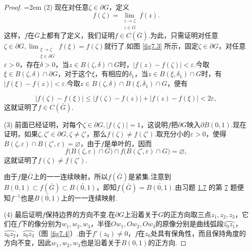 \begin{proof}
\noindent\begin{minipage}{0.7\textwidth}\parindent=2em
(2) \hypertarget{thm7.3.1.2}{}  现在对任意$\zeta\in\partial G$，定义
\[f(\zeta)=\lim_{\substack{z\to\zeta\\z\in G}}f(z).\]
这样，$f$在$\bar G$上都有了定义，我们证明$f\in C(\bar G)$.为此，只需证明对任意$\zeta\in\partial G,\lim_{\substack{\xi\to\zeta\\\xi\in \partial G}}f(\xi)=f(\zeta)$就行了.如图
\ref{fig7.3} 所示，固定$\zeta\in\partial G$，对任意$\varepsilon>0$，存在$\delta>0$，当$z\in B(\zeta,\delta)\cap G$时，$|f(z)-f(\zeta)|<\varepsilon$.今取$\xi\in B(\zeta,\delta)\cap\partial G$，对于这个$\xi$，有相应的$\delta_1$，当$z\in B(\xi,\delta_1)\cap G$时，有$|f(\xi)-f(z)|<\varepsilon$.今取$z\in B(\zeta,\delta)\cap B(\xi,\delta_1)\cap G$，便有
\end{minipage}
\begin{minipage}{0.3\textwidth}
\centering
{}
\end{minipage}
\[|f(\zeta)-f(\xi)|\le|f(\zeta)-f(z)|+|f(z)-f(\xi)|<2\varepsilon,\]
这就证明了$f\in C(\bar G)$.

(3) \hypertarget{thm7.3.1.3}{} 前面已经证明，对每个$\zeta\in\partial G,|f(\zeta)|=1$，这说明$f$把$\partial G$映入$\partial B(0,1)$.现在证明，如果$\zeta,\zeta'\in\partial G,\zeta\ne\zeta'$，那么$f(\zeta)\ne f(\zeta')$.取充分小的$\varepsilon>0$，使得$B(\zeta,\varepsilon)\cap B(\zeta',\varepsilon)=\varnothing$，由于$f$是单叶的，因而
\[f\big(B(\zeta,\varepsilon)\cap G\big)\cap f\big(B(\zeta',\varepsilon)\cap G\big)=
\varnothing,\]
这就证明了$f(\zeta)\ne f(\zeta')$.

由于$f$是$\bar G$上的一一连续映射，所以$f(\bar G)$是紧集.注意到$B(0,1)\subset f(\bar G)\subset\bar{B(0,1)}$，即知$f(\bar G)=\bar{B(0,1)}$.由习题 \hyperlink{xiti1.7}{1.7} 的第 \hyperlink{xiti1.7.7}{7} 题便知$f^{-1}$也是$\bar{B(0,1)}$上的一一连续映射.

(4) \hypertarget{thm7.3.1.4}{} 最后证明$f$保持边界的方向不变.在$\partial G$上沿着关于$G$的正方向取三点$z_1,z_2,z_3$，它们在$f$下的像分别为$w_1,w_2,w_3$，半径$Ow_1,Ow_2,Ow_3$的原像分别是曲线弧段$\wideparen{z_0z_1}$，$\wideparen{z_0z_2}$，$\wideparen{z_0z_3}$（图 \ref{fig7.4}）.由于$f'(z_0)\ne0$，$f$在$z_0$处具有保角性，而且保持角度的方向不变，因此$w_1,w_2,w_3$也是沿着关于$B(0,1)$的正方向.
\end{proof}
